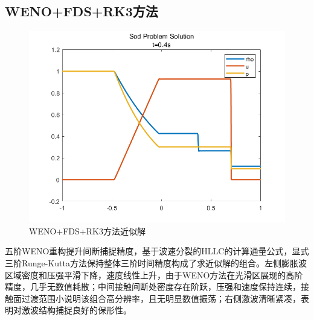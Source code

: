 \documentclass[12pt,a4paper]{article}%
\begin{document}
		\subsection{WENO+FDS+RK3方法}
		\begin{figure}[H]
			\centering
			\begin{minipage}{0.83\textwidth}
				\centering
				\includegraphics[width=\textwidth]{./fig/app2.png}
				\caption{\fontsize{10pt}{15pt}\selectfont WENO+FDS+RK3方法近似解}
			\end{minipage}
		\end{figure}
		五阶WENO重构提升间断捕捉精度，基于波速分裂的HLLC的计算通量公式，显式三阶Runge-Kutta方法保持整体三阶时间精度构成了求近似解的组合。左侧膨胀波区域密度和压强平滑下降，速度线性上升，由于WENO方法在光滑区展现的高阶精度，几乎无数值耗散；中间接触间断处密度存在阶跃，压强和速度保持连续，接触面过渡范围小说明该组合高分辨率，且无明显数值振荡；右侧激波清晰紧凑，表明对激波结构捕捉良好的保形性。
		
		
\end{document}
